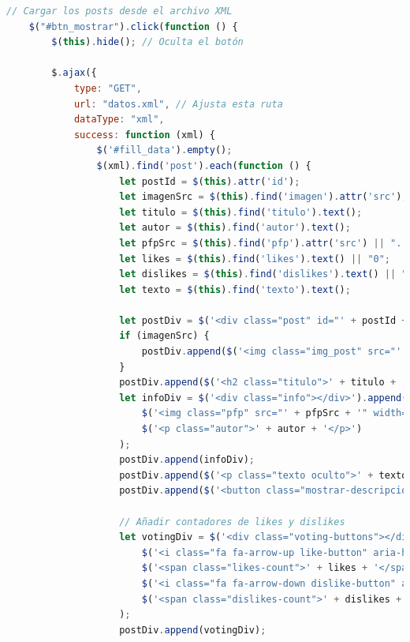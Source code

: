 \documentclass{article}
\begin{document}
\begin{lstlisting}[language=JavaScript, caption=Carga de los comentarios]
    // Cargar los posts desde el archivo XML
    $("#btn_mostrar").click(function () {
        $(this).hide(); // Oculta el botón

        $.ajax({
            type: "GET",
            url: "datos.xml", // Ajusta esta ruta
            dataType: "xml",
            success: function (xml) {
                $('#fill_data').empty();
                $(xml).find('post').each(function () {
                    let postId = $(this).attr('id');
                    let imagenSrc = $(this).find('imagen').attr('src');
                    let titulo = $(this).find('titulo').text();
                    let autor = $(this).find('autor').text();
                    let pfpSrc = $(this).find('pfp').attr('src') || "../Images/pfp.png";
                    let likes = $(this).find('likes').text() || "0"; 
                    let dislikes = $(this).find('dislikes').text() || "0";
                    let texto = $(this).find('texto').text();

                    let postDiv = $('<div class="post" id="' + postId + '"></div>');
                    if (imagenSrc) {
                        postDiv.append($('<img class="img_post" src="' + imagenSrc + '" alt="Imagen del post">'));
                    }
                    postDiv.append($('<h2 class="titulo">' + titulo + '</h2>'));
                    let infoDiv = $('<div class="info"></div>').append(
                        $('<img class="pfp" src="' + pfpSrc + '" width="50px" height="50px" alt="Imagen de perfil">'),
                        $('<p class="autor">' + autor + '</p>')
                    );
                    postDiv.append(infoDiv);
                    postDiv.append($('<p class="texto oculto">' + texto + '</p>'));
                    postDiv.append($('<button class="mostrar-descripcion"><i class="fas fa-plus"></i> Descripción</button>'));

                    // Añadir contadores de likes y dislikes
                    let votingDiv = $('<div class="voting-buttons"></div>').append(
                        $('<i class="fa fa-arrow-up like-button" aria-hidden="true"></i>'),
                        $('<span class="likes-count">' + likes + '</span>'),
                        $('<i class="fa fa-arrow-down dislike-button" aria-hidden="true"></i>'),
                        $('<span class="dislikes-count">' + dislikes + '</span>')
                    );
                    postDiv.append(votingDiv);


\end{lstlisting}
\end{document}
